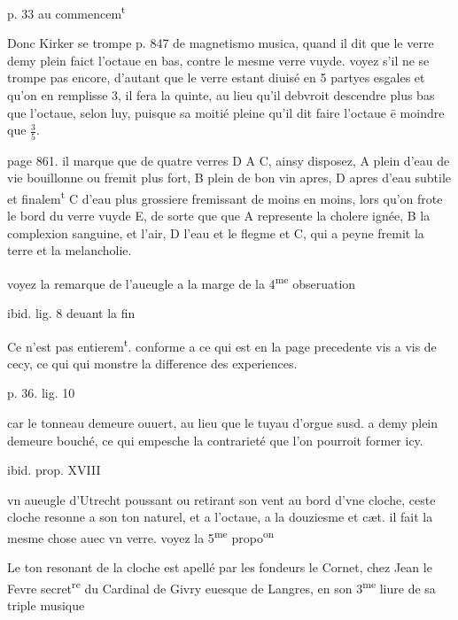 \documentclass[11pt,a4paper]{article}
\begin{document}
p. 33 au commencem\textsuperscript{t}

Donc Kirker se trompe p. 847 de magnetismo musica, quand il dit que le verre demy plein faict l'octaue en bas, contre le mesme verre vuyde. voyez s'il ne se trompe pas encore, d'autant que le verre estant diuisé en 5 partyes esgales et qu'on en remplisse 3, il fera la quinte, au lieu qu'il debvroit descendre plus bas que l'octaue, selon luy, puisque sa moitié pleine qu'il dit faire l'octaue ē moindre que $\frac{3}{5}$.

page 861. il marque que de quatre verres D A C, ainsy disposez, A plein d'eau de vie bouillonne ou fremit plus fort, B plein de bon vin apres, D apres d'eau subtile et finalem\textsuperscript{t} C d'eau plus grossiere fremissant de moins en moins, lors qu'on frote le bord du verre vuyde E, de sorte que que A represente la cholere ignée, B la complexion sanguine, et l'air, D l'eau et le flegme et C, qui a peyne fremit la terre et la melancholie.

voyez la remarque de l'aueugle a la marge de la 4\textsuperscript{me} obseruation

ibid. lig. 8 deuant la fin

Ce n'est pas entierem\textsuperscript{t}. conforme a ce qui est en la page precedente vis a vis de cecy, ce qui qui monstre la difference des experiences.


p. 36. lig. 10

car le tonneau demeure ouuert, au lieu que le tuyau d'orgue susd. a demy plein demeure bouché, ce qui empesche la contrarieté que l'on pourroit former icy.

ibid. prop. XVIII

vn aueugle d'Utrecht poussant ou retirant son vent au bord d'vne cloche, ceste cloche resonne a son ton naturel, et a l'octaue, a la douziesme et cæt. il fait la mesme chose auec vn verre. voyez la 5\textsuperscript{me} propo\textsuperscript{on}

Le ton resonant de la cloche est apellé par les fondeurs le Cornet, chez Jean le Fevre secret\textsuperscript{re} du Cardinal de Givry euesque de Langres, en son 3\textsuperscript{me} liure de sa triple musique
\end{document}
